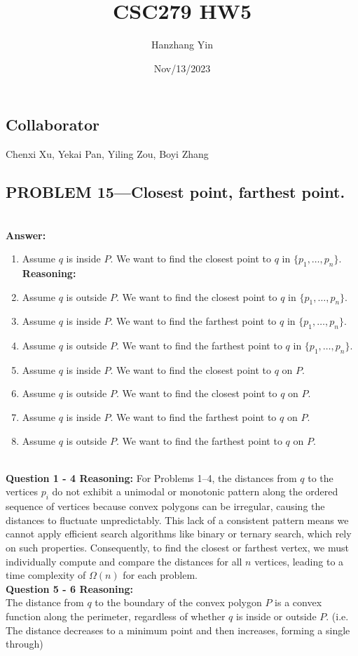 \documentclass{article}
\title{CSC279 HW5}
\author{Hanzhang Yin}
\date{Nov/13/2023}
\begin{document}
\maketitle

\subsection*{Collaborator}
Chenxi Xu, Yekai Pan, Yiling Zou, Boyi Zhang

\subsection*{PROBLEM 15---Closest point, farthest point.}
\\
\textbf{Answer: }

\begin{enumerate}
    \item Assume $q$ is inside $P$. We want to find the closest point to $q$ in $\{p_1, \dots, p_n\}$.
    \\
    \textbf{Reasoning: }
    \item Assume $q$ is outside $P$. We want to find the closest point to $q$ in $\{p_1, \dots, p_n\}$.
    \item Assume $q$ is inside $P$. We want to find the farthest point to $q$ in $\{p_1, \dots, p_n\}$.
    \item Assume $q$ is outside $P$. We want to find the farthest point to $q$ in $\{p_1, \dots, p_n\}$.
    \item Assume $q$ is inside $P$. We want to find the closest point to $q$ on $P$.
    \item Assume $q$ is outside $P$. We want to find the closest point to $q$ on $P$.
    \item Assume $q$ is inside $P$. We want to find the farthest point to $q$ on $P$.
    \item Assume $q$ is outside $P$. We want to find the farthest point to $q$ on $P$.
\end{enumerate}

\\
\textbf{Question 1 - 4 Reasoning: }
For Problems 1--4, the distances from \( q \) to the vertices \( p_i \) do not exhibit a unimodal or monotonic pattern along the ordered sequence of vertices because convex polygons can be irregular, causing the distances to fluctuate unpredictably. This lack of a consistent pattern means we cannot apply efficient search algorithms like binary or ternary search, which rely on such properties. Consequently, to find the closest or farthest vertex, we must individually compute and compare the distances for all \( n \) vertices, leading to a time complexity of \( \Omega(n) \) for each problem.
\\
\textbf{Question 5 - 6 Reasoning: }
\\
The distance from $q$ to the boundary of the convex polygon $P$ is a convex function along the perimeter, regardless of whether $q$ is inside or outside $P$.
(i.e. The distance decreases to a minimum point and then increases, forming a single through)
\end{document}
